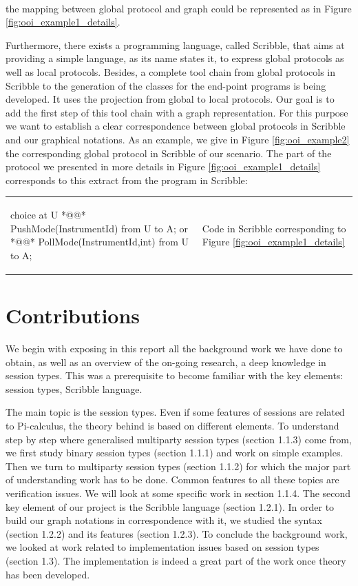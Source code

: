 \documentclass[a4paper,11pt,twoside]{report}
\begin{document}
~~\\
the mapping between global protocol and graph could be represented as in Figure \ref{fig:ooi_example1_details}.

Furthermore, there exists a programming language, called Scribble, that aims at providing a simple language, as its name states it, to express global protocols as well as local protocols. Besides, a complete tool chain from global protocols in Scribble to the generation of the classes for the end-point programs is being developed. It uses the projection from global to local protocols. Our goal is to add the first step of this tool chain with a graph representation. For this purpose we want to establish a clear correspondence between global protocols in Scribble and our graphical notations. As an example, we give in Figure \ref{fig:ooi_example2} the corresponding global protocol in Scribble of our scenario. The part of the protocol we presented in more details in Figure \ref{fig:ooi_example1_details} corresponds to this extract from the program in Scribble:\\

\begin{tabular}{ll}
\begin{SJLISTING}
choice at U { *@\label{line:userchoiceopen}@*
	PushMode(InstrumentId) from U to A;
} or { *@\label{line:userchoiceor}@*
	PollMode(InstrumentId,int) from U to A;
}
\end{SJLISTING}
& Code in Scribble corresponding to Figure \ref{fig:ooi_example1_details}
\end{tabular}




\section*{Contributions}

We begin with exposing in this report all the background work we have done to obtain, as well as an overview of the on-going research, a deep knowledge in session types. This was a prerequisite to become familiar with the key elements: session types, Scribble language. 

The main topic is the session types. Even if some features of sessions are related to Pi-calculus, the theory behind is based on different elements. To understand step by step where generalised multiparty session types (section 1.1.3) come from, we first study binary session types (section 1.1.1) and work on simple examples. Then we turn to multiparty session types (section 1.1.2) for which the major part of understanding work has to be done. Common features to all these topics are verification issues. We will look at some specific work in section 1.1.4. The second key element of our project is the Scribble language (section 1.2.1). In order to build our graph notations in correspondence with it, we studied the syntax (section 1.2.2) and its features (section 1.2.3). To conclude the background work, we looked at work related to implementation issues based on session types (section 1.3). The implementation is indeed a great part of the work once theory has been developed.
\end{document}
